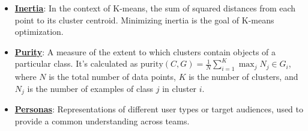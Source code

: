 \documentclass{article}%
\begin{document}
\begin{itemize}[leftmargin=*]
\item \href{https://purdue.brightspace.com/d2l/common/assets/pdfjs-d2l-dist/1.0.14-legacy/web/viewer.html?file=\%2Fcontent\%2Fenforced\%2F1095467-wl.202510.CS.24300.001\%2F12L2-distance-clusters.pdf\%3Fou\%3D1095467\&lang=en-us\&container=d2l-fileviewer-rendered-pdf\&fullscreen=d2l-fileviewer-rendered-pdf-dialog\&height=667#page=33}{\textbf{Inertia}}: In the context of K-means, the sum of squared distances from each point to its cluster centroid. Minimizing inertia is the goal of K-means optimization.%
\item \href{https://purdue.brightspace.com/d2l/common/assets/pdfjs-d2l-dist/1.0.14-legacy/web/viewer.html?file=\%2Fcontent\%2Fenforced\%2F1095467-wl.202510.CS.24300.001\%2F12L2-distance-clusters.pdf\%3Fou\%3D1095467\&lang=en-us\&container=d2l-fileviewer-rendered-pdf\&fullscreen=d2l-fileviewer-rendered-pdf-dialog\&height=667#page=44}{\textbf{Purity}}: A measure of the extent to which clusters contain objects of a particular class. It's calculated as $\text{purity}(C, G) = \frac{1}{N} \sum_{i=1}^K \max_j N_j \in G_i$, where $N$ is the total number of data points, $K$ is the number of clusters, and $N_j$ is the number of examples of class $j$ in cluster $i$.%
\item \href{https://purdue.brightspace.com/d2l/common/assets/pdfjs-d2l-dist/1.0.14-legacy/web/viewer.html?file=\%2Fcontent\%2Fenforced\%2F1095467-wl.202510.CS.24300.001\%2F12L2-distance-clusters.pdf\%3Fou\%3D1095467\&lang=en-us\&container=d2l-fileviewer-rendered-pdf\&fullscreen=d2l-fileviewer-rendered-pdf-dialog\&height=667#page=11}{\textbf{Personas}}: Representations of different user types or target audiences, used to provide a common understanding across teams.%
\end{itemize}%
\end{document}

